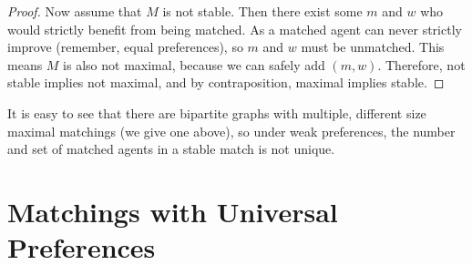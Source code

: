 \documentclass[12pt]{article}
\begin{document}
\begin{enumerate}[(a)]
\begin{proof}
Now assume that $M$ is not stable. Then there exist some $m$ and $w$ who would strictly benefit from being matched. As a matched agent can never strictly improve (remember, equal preferences), so $m$ and $w$ must be unmatched. This means $M$ is also not maximal, because we can safely add $(m, w)$. Therefore, not stable implies not maximal, and by contraposition, maximal implies stable.
\end{proof}

It is easy to see that there are bipartite graphs with multiple, different size maximal matchings (we give one above), so under weak preferences, the number and set of matched agents in a stable match is not unique. 
\end{enumerate}


\section{Matchings with Universal Preferences}
\end{document}
